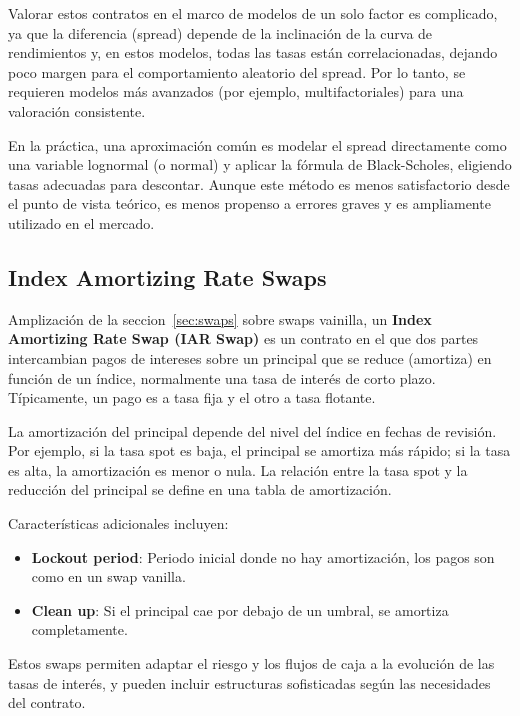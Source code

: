 Valorar estos contratos en el marco de modelos de un solo factor es complicado, ya que la diferencia (spread) depende de la inclinación de la curva de rendimientos y, en estos modelos, todas las tasas están correlacionadas, dejando poco margen para el comportamiento aleatorio del spread. Por lo tanto, se requieren modelos más avanzados (por ejemplo, multifactoriales) para una valoración consistente.

En la práctica, una aproximación común es modelar el spread directamente como una variable lognormal (o normal) y aplicar la fórmula de Black-Scholes, eligiendo tasas adecuadas para descontar. Aunque este método es menos satisfactorio desde el punto de vista teórico, es menos propenso a errores graves y es ampliamente utilizado en el mercado.




\subsection{Index Amortizing Rate Swaps}

Amplización de la seccion~\ref{sec:swaps} sobre swaps vainilla, un \textbf{Index Amortizing Rate Swap (IAR Swap)} es un contrato en el que dos partes intercambian pagos de intereses sobre un principal que se reduce (amortiza) en función de un índice, normalmente una tasa de interés de corto plazo. Típicamente, un pago es a tasa fija y el otro a tasa flotante.

La amortización del principal depende del nivel del índice en fechas de revisión. Por ejemplo, si la tasa spot es baja, el principal se amortiza más rápido; si la tasa es alta, la amortización es menor o nula. La relación entre la tasa spot y la reducción del principal se define en una tabla de amortización.

Características adicionales incluyen:
\begin{itemize}
    \item \textbf{Lockout period}: Periodo inicial donde no hay amortización, los pagos son como en un swap vanilla.
    \item \textbf{Clean up}: Si el principal cae por debajo de un umbral, se amortiza completamente.
\end{itemize}

Estos swaps permiten adaptar el riesgo y los flujos de caja a la evolución de las tasas de interés, y pueden incluir estructuras sofisticadas según las necesidades del contrato.






